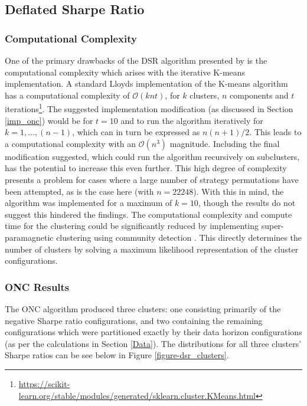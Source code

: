 \documentclass[a4paper,11pt,oneside]{article}
\theoremstyle{plain}
\theoremstyle{definition}
\begin{document}
	\newpage

	\subsection{Deflated Sharpe Ratio}\label{results_dsr}	
	
	\subsubsection{Computational Complexity}
	
	One of the primary drawbacks of the DSR algorithm presented by \citet{PradoDSR} is the computational complexity which arises with the iterative K-means implementation. A standard Lloyds implementation of the K-means algorithm has a computational complexity of $\mathcal{O}(knt)$, for $k$ clusters, $n$ components and $t$ iterations\footnote{\url{https://scikit-learn.org/stable/modules/generated/sklearn.cluster.KMeans.html}}. The suggested implementation modification (as discussed in Section \ref{imp_onc}) would be for $t=10$ and to run the algorithm iteratively for $k=1,...,(n-1)$, which can in turn be expressed as $n(n+1)/2$. This leads to a computational complexity with an $\mathcal{O}(n^3)$ magnitude. Including the final modification suggested, which could run the algorithm recursively on subclusters, has the potential to increase this even further. This high degree of complexity presents a problem for cases where a large number of strategy permutations have been attempted, as is the case here (with $n = 22248$). With this in mind, the algorithm was implemented for a maximum of $k=10$, though the results do not suggest this hindered the findings. The computational complexity and compute time for the clustering could be significantly reduced by implementing super-paramagnetic clustering using community detection \cite{YELIBI2020124049}. This directly determines the number of clusters by solving a maximum likelihood representation of the cluster configurations. \newline
	
	\subsubsection{ONC Results}\label{results_onc}
	
	The ONC algorithm produced three clusters: one consisting primarily of the negative Sharpe ratio configurations, and two containing the remaining configurations which were partitioned exactly by their data horizon configurations (as per the calculations in Section \ref{Data}). The distributions for all three clusters' Sharpe ratios can be see below in Figure \ref{figure-dsr_clusters}.\newline
		
\end{document}
